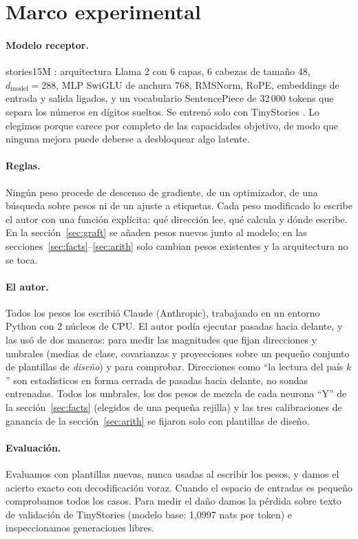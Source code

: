 \documentclass[11pt]{article}
\begin{document}
\section{Marco experimental}
\paragraph{Modelo receptor.} stories15M \cite{llama2c}: arquitectura Llama 2 con 6 capas, 6 cabezas de tamaño 48, $d_\text{model}=288$, MLP SwiGLU de anchura 768, RMSNorm, RoPE, embeddings de entrada y salida ligados, y un vocabulario SentencePiece de 32\,000 tokens que separa los números en dígitos sueltos. Se entrenó solo con TinyStories \cite{tinystories}. Lo elegimos porque carece por completo de las capacidades objetivo, de modo que ninguna mejora puede deberse a desbloquear algo latente.

\paragraph{Reglas.} Ningún peso procede de descenso de gradiente, de un optimizador, de una búsqueda sobre pesos ni de un ajuste a etiquetas. Cada peso modificado lo escribe el autor con una función explícita: qué dirección lee, qué calcula y dónde escribe. En la sección~\ref{sec:graft} se añaden pesos nuevos junto al modelo; en las secciones~\ref{sec:facts}--\ref{sec:arith} solo cambian pesos existentes y la arquitectura no se toca.

\paragraph{El autor.} Todos los pesos los escribió Claude (Anthropic), trabajando en un entorno Python con 2 núcleos de CPU. El autor podía ejecutar pasadas hacia delante, y las usó de dos maneras: para medir las magnitudes que fijan direcciones y umbrales (medias de clase, covarianzas y proyecciones sobre un pequeño conjunto de plantillas de \emph{diseño}) y para comprobar. Direcciones como ``la lectura del país $k$'' son estadísticos en forma cerrada de pasadas hacia delante, no sondas entrenadas. Todos los umbrales, los dos pesos de mezcla de cada neurona ``Y'' de la sección~\ref{sec:facts} (elegidos de una pequeña rejilla) y las tres calibraciones de ganancia de la sección~\ref{sec:arith} se fijaron solo con plantillas de diseño.

\paragraph{Evaluación.} Evaluamos con plantillas nuevas, nunca usadas al escribir los pesos, y damos el acierto exacto con decodificación voraz. Cuando el espacio de entradas es pequeño comprobamos todos los casos. Para medir el daño damos la pérdida sobre texto de validación de TinyStories (modelo base: 1,0997 nats por token) e inspeccionamos generaciones libres.
\end{document}

